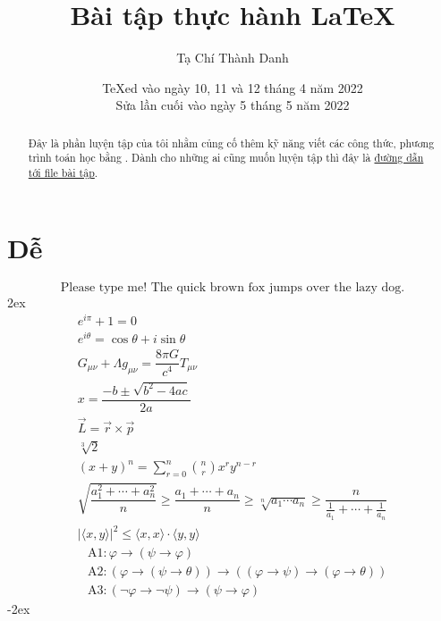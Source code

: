 \documentclass[a4paper,12pt,notitlepage]{article}
\title{Bài tập thực hành \LaTeX}
\author{Tạ Chí Thành Danh}
\date{\TeX ed vào ngày 10, 11 và 12 tháng 4 năm 2022 \\ Sửa lần cuối vào ngày 5 tháng 5 năm 2022}
\newcommand{\f}[2]{\dfrac{#1}{#2}}
\begin{document}
	\maketitle
	\begin{abstract}
		Đây là phần luyện tập của tôi nhằm củng cố thêm kỹ năng viết các công thức, phương trình toán học bằng \LaTeXe.
		Dành cho những ai cũng muốn luyện tập thì đây là \href{https://web.mit.edu/~jgross/Public/latex/exercises.pdf}{đường dẫn tới file bài tập}.
	\end{abstract}
	\section{Dễ}
	\begin{equation}
		\text{Please type me! The quick brown fox jumps over the lazy dog.}
	\end{equation}
	\openup 2ex
	\begin{gather}
		e^{i \pi} + 1 = 0 \\
		e^{i \theta} = \cos \theta + i \sin \theta \\
		G_{\mu \nu} + \Lambda g_{\mu \nu} = \f{8\pi G}{c^4} T_{\mu \nu} \\
		x = \f{-b \pm \sqrt{b^2 - 4ac}}{2a} \\
		\vec{L} = \vec{r} \times \vec{p} \\
		\sqrt[3]{2} \\
		(x + y)^n = \sum_{r=0}^{n} \binom{n}{r} x^r y^{n-r} \\
		\sqrt{\f{a_1^2 + \cdots + a_n^2}{n}} \geq \f{a_1 + \cdots + a_n}{n} \geq \sqrt[n]{a_1 \cdots a_n} \geq \f{n}{\tfrac{1}{a_1} + \cdots + \tfrac{1}{a_n}} \\
		| \langle x, y \rangle | ^2 \leq \langle x, x \rangle \cdot \langle y, y \rangle %
	\end{gather}
	\begin{align}
	& \mathrm{A}1: \varphi \longrightarrow (\psi \rightarrow \varphi) \nonumber \\[-2ex]
	& \mathrm{A}2: (\varphi \rightarrow (\psi \rightarrow \theta)) \longrightarrow ((\varphi \rightarrow \psi) \rightarrow (\varphi \rightarrow \theta)) \nonumber \\[-2ex]
	& \mathrm{A}3: (\neg \varphi \rightarrow \neg \psi) \longrightarrow (\psi \rightarrow \varphi) 
	\end{align}
	\openup -2ex
\end{document}
